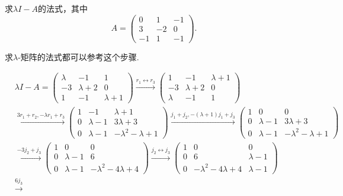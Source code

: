 \documentclass[../../main.tex]{subfiles}%
\begin{document}
\begin{example}
求$\lambda I - A$的法式，其中
\[A = \begin{pmatrix}
0 & 1 & -1 \\
3 & -2 & 0 \\
-1 & 1 & -1
\end{pmatrix}.\]
\end{example}
\begin{remark}
求$\lambda$-矩阵的法式都可以参考这个步骤.
\end{remark}
\begin{solution}
\begin{align*}
&\lambda I - A = 
\begin{pmatrix}
\lambda & -1 & 1 \\
-3 & \lambda + 2 & 0 \\
1 & -1 & \lambda + 1
\end{pmatrix}
\xrightarrow{r_1\leftrightarrow r_3}
\begin{pmatrix}
1 & -1 & \lambda + 1 \\
-3 & \lambda + 2 & 0 \\
\lambda & -1 & 1
\end{pmatrix}\\
&\xrightarrow{3r_1+r_2,-\lambda r_1+r_3}
\begin{pmatrix}
1 & -1 & \lambda + 1 \\
0 & \lambda - 1 & 3\lambda + 3 \\
0 & \lambda - 1 & -\lambda^2 - \lambda + 1
\end{pmatrix}
\xrightarrow{j_1+j_2,-(\lambda +1)j_1+j_3}
\begin{pmatrix}
1 & 0 & 0 \\
0 & \lambda - 1 & 3\lambda + 3 \\
0 & \lambda - 1 & -\lambda^2 - \lambda + 1
\end{pmatrix}\\
&\xrightarrow{-3j_2+j_3}
\begin{pmatrix}
1 & 0 & 0 \\
0 & \lambda - 1 & 6 \\
0 & \lambda - 1 & -\lambda^2 - 4\lambda + 4
\end{pmatrix}
\xrightarrow{j_2\leftrightarrow j_3}
\begin{pmatrix}
1 & 0 & 0 \\
0 & 6 & \lambda - 1 \\
0 & -\lambda^2 - 4\lambda + 4 & \lambda - 1
\end{pmatrix}\\
&\xrightarrow{6j_3}

\end{align*}
\end{solution}
\end{document}
